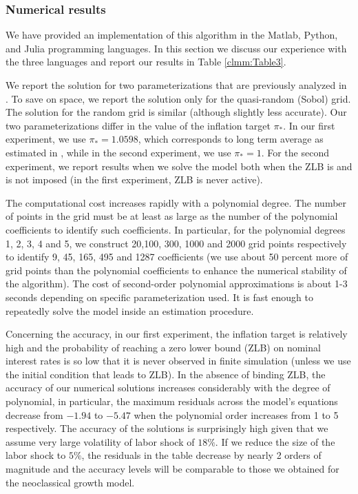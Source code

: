 \subsubsection{Numerical results}

We have provided an implementation of this algorithm in the Matlab, Python, and Julia programming
languages. In this section we discuss our experience with the three languages and report our results
in Table \ref{clmm:Table3}.

We report the solution for two parameterizations that are previously analyzed in \cite{MM2015}. To
save on space, we report the solution only for the quasi-random (Sobol) grid. The solution for the
random grid is similar (although slightly less accurate). Our two parameterizations differ in the
value of the inflation target $\pi _{\ast }$. In our first experiment, we use $\pi _{\ast }=1.0598$,
which corresponds to long term average as estimated in \cite{DSSW2007}, while in the second
experiment, we use $\pi _{\ast }=1.$ For the second experiment, we report results when we solve the
model both when the ZLB is and is not imposed (in the first experiment, ZLB is never active).

The computational cost increases rapidly with a polynomial degree. The number of points in the grid
must be at least as large as the number of the polynomial coefficients to identify such
coefficients. In particular, for the polynomial degrees 1, 2, 3, 4 and 5, we construct 20,100, 300,
1000 and 2000 grid points respectively to identify 9, 45, 165, 495 and 1287 coefficients (we use
about 50 percent more of grid points than the polynomial coefficients to enhance the numerical
stability of the algorithm). The cost of second-order polynomial approximations is about 1-3 seconds
depending on specific parameterization used. It is fast enough to repeatedly solve the model inside
an estimation procedure.

Concerning the accuracy, in our first experiment, the inflation target is relatively high and the
probability of reaching a zero lower bound (ZLB) on nominal interest rates is so low that it is
never observed in finite simulation (unless we use the initial condition that leads to ZLB). In the
absence of binding ZLB, the accuracy of our numerical solutions increases considerably with the
degree of polynomial, in particular, the maximum residuals across the model's equations decrease
from $-1.94$ to $-5.47$ when the polynomial order increases from 1 to 5 respectively. The accuracy
of the solutions is surprisingly high given that we assume very large volatility of labor shock of
$18\%$. If we reduce the size of the labor shock to $5\%$, the residuals in the table decrease by
nearly 2 orders of magnitude and the accuracy levels will be comparable to those we obtained for the
neoclassical growth model.

